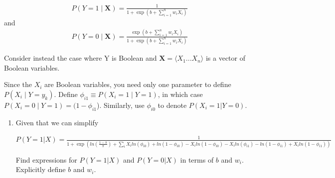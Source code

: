 \documentclass[12pt,addpoints,answers]{exam}
\newcommand{\Xv}{\mathbf{X}}
\begin{document}
\begin{enumerate}
\begin{align*}
    P(Y=1\mid\Xv)=\frac{1}{1+\exp(b+\sum_{i=1}^{n} w_iX_i)}
\end{align*}
and
\begin{align*}
    P(Y=0\mid\Xv)=\frac{\exp(b+\sum_{i=1}^{n} w_iX_i)}{1+\exp(b+\sum_{i=1}^{n} w_iX_i)}
\end{align*}

 Consider instead the case where Y is Boolean and ${\Xv = \langle{X_{1}...X_{n}}}\rangle$ is a vector
of Boolean variables.


Since the $X_{i}$ are Boolean variables, you need only one parameter to define $P(X_{i}\mid{Y} = y_k)$. Define $\phi_{i1} \equiv P(X_{i} = 1\mid{Y = 1})$, in which case $P(X_{i} = 0\mid{Y = 1}) = (1-\phi_{i1}$). Similarly, use $\phi_{i0}$ to denote $P(X_{i} = 1|Y = 0)$. 

\begin{enumerate}
    \item Given that we can simplify 
        
        $P(Y=1|X) = \frac{1}{1+\exp(ln(\frac{1-\pi}{\pi}) +\sum_i X_iln(\phi_{i0}) + ln(1-\phi_{i0}) - X_iln(1-\phi_{i0}) - X_iln(\phi_{i1}) - ln(1-\phi_{i1}) + X_iln(1-\phi_{i1}))}$ 
        
        Find expressions for $P(Y=1|X)$ and $P(Y=0|X)$ in terms of $b$ and $w_i$. Explicitly define $b$ and $w_i$.
        
        \begin{tcolorbox}[fit,height=10cm, blank, borderline={1pt}{-2pt},nobeforeafter]
    
    \end{tcolorbox}
        
\end{enumerate}


\end{enumerate}

\clearpage





 \clearpage


\clearpage
\end{document}
